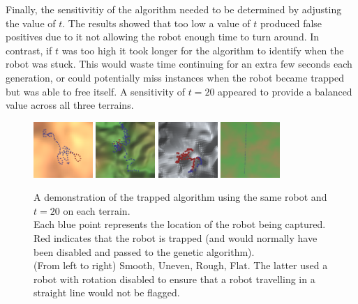 \documentclass{article}
\begin{document}
Finally, the sensitivitiy of the algorithm needed to be determined by adjusting the value of $t$. The results showed that too low a value of $t$ produced false positives due to it not allowing the robot enough time to turn around. In contrast, if $t$ was too high it took longer for the algorithm to identify when the robot was stuck. This would waste time continuing for an extra few seconds each generation, or could potentially miss instances when the robot became trapped but was able to free itself. A sensitivity of $t=20$ appeared to provide a balanced value across all three terrains.

\begin{figure}[H]
\centering
\includegraphics[width=0.2\textwidth]{trappedSmooth}
\includegraphics[width=0.2\textwidth]{trappedUneven}
\includegraphics[width=0.2\textwidth]{trappedRough}
\includegraphics[width=0.2\textwidth]{trappedFlat}
\caption{A demonstration of the trapped algorithm using the same robot and $t=20$ on each terrain.\\
Each blue point represents the location of the robot being captured. Red indicates that the robot is trapped (and would normally have been disabled and passed to the genetic algorithm).\\ 
(From left to right) Smooth, Uneven, Rough, Flat. The latter used a robot with rotation disabled to ensure that a robot travelling in a straight line would not be flagged.}
\end{figure}
\end{document}
